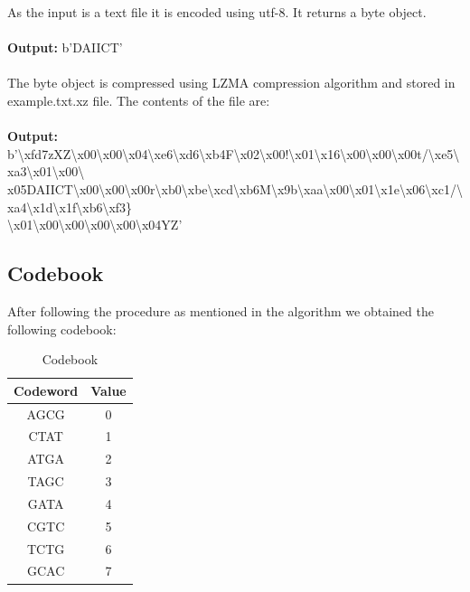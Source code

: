 \documentclass[11pt]{article}
\begin{document}
As the input is a text file it is encoded using utf-8. It returns a byte object. \\ \\
\textbf{Output:} b'DAIICT'
\\ \\
The byte object is compressed using LZMA compression algorithm and stored in example.txt.xz file. The contents of the file are: \\ \\
\textbf{Output:} b'\textbackslash xfd7zXZ\textbackslash x00\textbackslash x00\textbackslash x04\textbackslash xe6\textbackslash xd6\textbackslash xb4F\textbackslash x02\textbackslash x00!\textbackslash x01\textbackslash x16\textbackslash x00\textbackslash x00\textbackslash x00t/\textbackslash xe5\textbackslash xa3\textbackslash x01\textbackslash x00\textbackslash \\ x05DAIICT\textbackslash x00\textbackslash x00\textbackslash x00r\textbackslash xb0\textbackslash xbe\textbackslash xcd\textbackslash xb6M\textbackslash x9b\textbackslash xaa\textbackslash x00\textbackslash x01\textbackslash x1e\textbackslash x06\textbackslash xc1/\textbackslash xa4\textbackslash x1d\textbackslash x1f\textbackslash xb6\textbackslash xf3\} \\ \textbackslash x01\textbackslash x00\textbackslash x00\textbackslash x00\textbackslash x00\textbackslash x04YZ'

\subsection{Codebook}

After following the procedure as mentioned in the algorithm we obtained the following codebook:

\begin{table}[h!]
\begin{center}
\begin{tabular}{ |c|c| }
 \hline
 Codeword & Value \\
 \hline
 \hline
 AGCG & 0 \\ 
 CTAT & 1 \\
 ATGA & 2 \\
 TAGC & 3 \\
 GATA & 4 \\
 CGTC & 5 \\
 TCTG & 6 \\
 GCAC & 7 \\
 \hline
\end{tabular}
\caption{Codebook}
\end{center}
\end{table}
\end{document}
